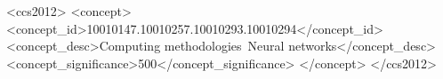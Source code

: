 \documentclass[format=acmsmall, review=false, screen=true]{acmart}
\begin{document}
%
%
\begin{CCSXML}
	<ccs2012>
	<concept>
	<concept_id>10010147.10010257.10010293.10010294</concept_id>
	<concept_desc>Computing methodologies~Neural networks</concept_desc>
	<concept_significance>500</concept_significance>
	</concept>
	</ccs2012>
\end{CCSXML}


%
%






\maketitle

\renewcommand{\shortauthors}{Y. Li et al.}

%








\end{document}
